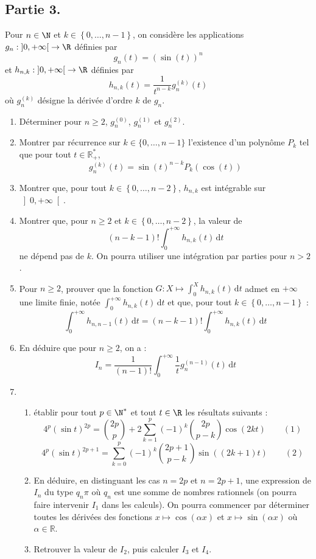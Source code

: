 \documentclass[a4paper,french,11pt,twoside]{VcCours}
\newcommand{\dt}{\text{d}t}
\begin{document}
\bigskip

\subsection*{Partie 3.}

\bigskip

Pour $n \in \N$ et $k \in \left\{ 0, \ldots, n-1 \right\}$, on consid{\`e}re les applications  $g_n : \left]0, +\infty \right[ \rightarrow \R$ définies par 
$$g_n(t) = (\sin(t))^n$$
et $h_{n,k} : \left]0, +\infty \right[ \rightarrow \R$ définies par 
$$h_{n,k}(t) = \frac{1}{t^{n-k}}g_n^{(k)}(t)$$
o{\`u} $g_n^{(k)}$ désigne la dérivée d'ordre $k$ de $g_n$.

\medskip

\begin{enumerate}
\item Déterminer pour $n \geq 2$, $g_n^{(0)}$, $g_n^{(1)}$ et $g_n^{(2)}$.
\item Montrer par récurrence sur $k \in \lbrace 0, \ldots, n-1 \rbrace$ l'existence d'un polynôme $P_k$ tel que pour tout $t \in \mathbb{R}_+^{*}$,
$$ g_n^{(k)}(t) =  \sin(t)^{n-k} P_k(\cos(t))$$
\item Montrer que, pour tout $k \in \left\{ 0, \ldots, n-2 \right\}$, $h_{n,k}$ est intégrable sur $\left]0, +\infty \right[$.
\item Montrer que, pour $n \geq 2$ et $k \in \left\{ 0, \ldots, n-2 \right\}$, la valeur de 
$$(n-k-1)! \int_0^{+\infty} h_{n,k}(t) \, \dt$$
 ne dépend pas de $k$. On pourra utiliser une intégration par parties pour $n>2$.
\item Pour $n \geq 2$, prouver que la fonction $G : X \mapsto \int_0^X h_{n,k}(t) \, \dt$ admet en $+\infty$ une limite finie, notée $\int_0^{+\infty} h_{n,k}(t) \, \dt$ et que, pour tout $k \in \left\{ 0, \ldots, n-1 \right\}$ :
\[ \int_0^{+\infty} h_{n,n-1}(t) \, \dt = (n-k-1)! \int_0^{+\infty} h_{n,k}(t) \, \dt \]
\item En déduire que pour $n \geq 2$, on a :
$$I_n= \frac{1}{(n-1)!} \int_0^{+\infty} \frac{1}{t} g_n^{(n-1)}(t) \, \dt$$
\item 
\begin{enumerate}
\item établir pour tout $p \in \N^*$ et tout $t \in \R$ les résultats suivants :
\[ 4^p (\sin t)^{2p} = \binom{2p}{p} + 2 \sum_{k=1}^p (-1)^k \binom{2p}{p-k} \cos(2kt) \qquad (1) \]
 \[ 4^p (\sin t)^{2p+1} = \sum_{k=0}^p (-1)^k \binom{2p+1}{p-k} \sin((2k+1)t) \qquad (2) \]
\item En déduire, en distinguant les cas $n = 2p$ et $n = 2p+1$, une expression de $I_n$ du type $q_n \pi$ o{\`u} $q_n$ est une somme de nombres rationnels (on pourra faire intervenir $I_1$ dans les calculs). On pourra commencer par déterminer toutes les dérivées des fonctions $x \mapsto \cos(\alpha x)$ et $x \mapsto \sin(\alpha x)$ où $\alpha \in \mathbb{R}$.
\item Retrouver la valeur de $I_2$, puis calculer $I_3$ et $I_4$.
\end{enumerate}
\end{enumerate}
\end{document}

